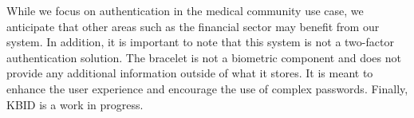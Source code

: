 While we focus on authentication in the medical community use case, we anticipate that other areas such as the financial sector may benefit from our system. In addition, it is important to note that this system is not a two-factor authentication solution. The bracelet is not a biometric component and does not provide any additional information outside of what it stores. It is meant to enhance the user experience and encourage the use of complex passwords. Finally, KBID is a work in progress.







